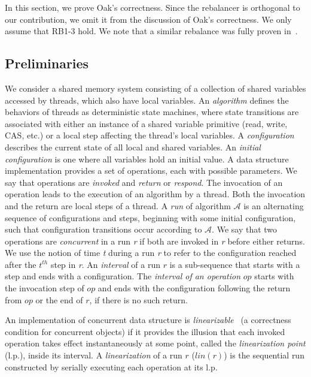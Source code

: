 \label{sec:correctness}
In this section, we prove Oak's correctness.
Since the rebalancer is orthogonal to our contribution, we omit it from the discussion of Oak's correctness.
We only assume that RB1-3 hold.
We note that a similar rebalance was fully proven in~\cite{Braginsky-BTree}.

\subsection{Preliminaries}

We consider a shared memory system consisting of a collection of shared variables accessed by threads, which also have local variables.
An \emph{algorithm} defines the behaviors of threads as deterministic state machines, where state transitions are associated with either an instance of a shared variable primitive (read, write, CAS, etc.) or a local step affecting the thread's local variables.
A \emph{configuration} describes the current state of all local and shared variables. An \emph{initial configuration} is one where all variables  hold an initial value.
A data structure implementation provides a set of operations, each with possible parameters. 
We say that operations are \emph{invoked} and \emph{return} or \emph{respond}.
The invocation of an operation leads to the execution of an algorithm by a thread.
Both the invocation and the return are local steps of a thread.
A \emph{run} of algorithm $\mathcal{A}$ is an alternating sequence of configurations and steps, beginning with some initial configuration, such that configuration transitions occur according to $\mathcal{A}$.
We say that two operations are \emph{concurrent} in a run \emph{r} if both are invoked in \emph{r} before either returns.
We use the notion of time \emph{t} during a run \emph{r} to refer to the configuration reached after the $t^{th}$ step in \emph{r}.
An \emph{interval} of a run $r$ is a sub-sequence that starts
with a step and ends with a configuration.
The \emph{interval of an operation} $op$ starts with the invocation step of $op$ and ends with the configuration following the return from $op$ or the end of $r$, if there is no such return.

An implementation of concurrent data structure is \emph{linearizable}~\cite{linearizability} (a correctness
condition for concurrent objects) if it provides the illusion that each invoked operation takes effect instantaneously at some point, called the \emph{linearization point} (l.p.), inside its interval. 
A \emph{linearization} of a run $r$ ($lin(r)$) is the sequential run constructed by serially executing each operation at its l.p.

